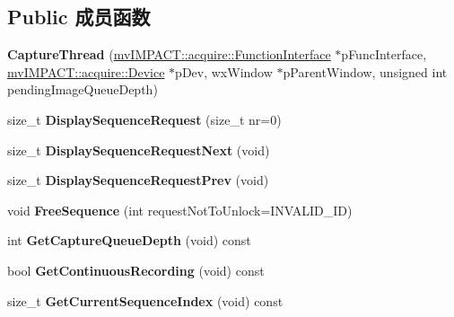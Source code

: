 \subsection*{Public 成员函数}
\begin{DoxyCompactItemize}
\item 
\hypertarget{class_capture_thread_ad24259e69fbf7f648ff01c88d38bb683}{{\bfseries Capture\+Thread} (\hyperlink{classmv_i_m_p_a_c_t_1_1acquire_1_1_function_interface}{mv\+I\+M\+P\+A\+C\+T\+::acquire\+::\+Function\+Interface} $\ast$p\+Func\+Interface, \hyperlink{classmv_i_m_p_a_c_t_1_1acquire_1_1_device}{mv\+I\+M\+P\+A\+C\+T\+::acquire\+::\+Device} $\ast$p\+Dev, wx\+Window $\ast$p\+Parent\+Window, unsigned int pending\+Image\+Queue\+Depth)}\label{class_capture_thread_ad24259e69fbf7f648ff01c88d38bb683}

\item 
\hypertarget{class_capture_thread_a1237df9b006897557885e516405c74f0}{size\+\_\+t {\bfseries Display\+Sequence\+Request} (size\+\_\+t nr=0)}\label{class_capture_thread_a1237df9b006897557885e516405c74f0}

\item 
\hypertarget{class_capture_thread_a36d9be1a6b9cd170dacd00f49f3afc04}{size\+\_\+t {\bfseries Display\+Sequence\+Request\+Next} (void)}\label{class_capture_thread_a36d9be1a6b9cd170dacd00f49f3afc04}

\item 
\hypertarget{class_capture_thread_a089d340173f29f56e348bbed34ae2bb0}{size\+\_\+t {\bfseries Display\+Sequence\+Request\+Prev} (void)}\label{class_capture_thread_a089d340173f29f56e348bbed34ae2bb0}

\item 
\hypertarget{class_capture_thread_a2d04be266205c3032443a769ff60cbe2}{void {\bfseries Free\+Sequence} (int request\+Not\+To\+Unlock=I\+N\+V\+A\+L\+I\+D\+\_\+\+I\+D)}\label{class_capture_thread_a2d04be266205c3032443a769ff60cbe2}

\item 
\hypertarget{class_capture_thread_aeb33cb0eb5e8fd61aa13d13a77055b5b}{int {\bfseries Get\+Capture\+Queue\+Depth} (void) const }\label{class_capture_thread_aeb33cb0eb5e8fd61aa13d13a77055b5b}

\item 
\hypertarget{class_capture_thread_aff1d4b5a3a2a140ec332dace493479c1}{bool {\bfseries Get\+Continuous\+Recording} (void) const }\label{class_capture_thread_aff1d4b5a3a2a140ec332dace493479c1}

\item 
\hypertarget{class_capture_thread_ac3a0766d3c6edc355cf8690b29f420bb}{size\+\_\+t {\bfseries Get\+Current\+Sequence\+Index} (void) const }\label{class_capture_thread_ac3a0766d3c6edc355cf8690b29f420bb}


\end{DoxyCompactItemize}
